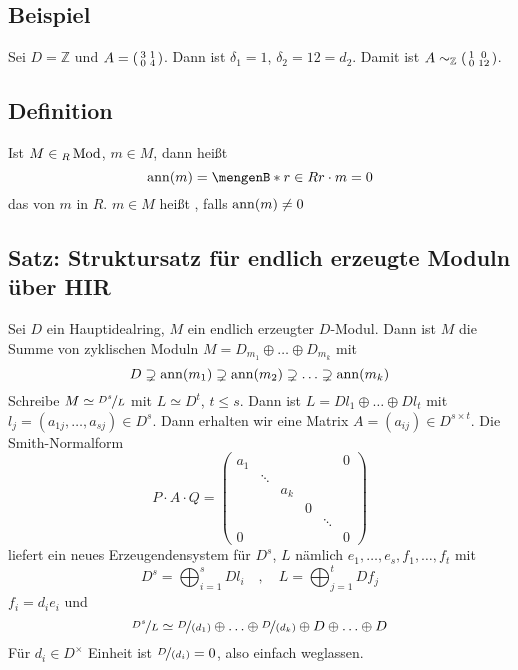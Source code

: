 \subsection[Beispiel: Elementarteilersatz]{Beispiel} %
\label{sub:246}
Sei $D= \mathds{Z}$ und $A = \begin{psmallmatrix}
	3 & 1 \\
	0 & 4
\end{psmallmatrix}$. Dann ist $\delta_1 = 1$, $\delta_2=12= d_2$. Damit ist $A \sim_\mathds{Z} \begin{psmallmatrix}
	1 & 0 \\
	0 & 12
\end{psmallmatrix}$.

\subsection[Definition: Annulatorideal und Torsionselement]{Definition} %
\label{sub:247}
Ist $M \in {_R\Mod}$, $m \in M$, dann heißt 
\[
	\ann(m) = \set[r \in R]{r \cdot m = 0} 
\]
das  von $m$ in $R$. $m \in M$ heißt , falls $\ann(m) \not= 0$  

\subsection{Satz: Struktursatz für endlich erzeugte Moduln über HIR} %
\label{sub:248}
Sei $D$ ein Hauptidealring, $M$ ein endlich erzeugter $D$-Modul. Dann ist $M$ die Summe von zyklischen Moduln $M= D_{m_1} \oplus \ldots \oplus D_{m_k}$ mit 
\[
	D \supsetneq \ann(m_1) \supsetneq \ann(m_2) \supsetneq \ldots \supsetneq \ann(m_k)
\]
Schreibe $M \simeq \nicefrac{D^s}{L}$ mit $L \simeq D^t$, $t \le s$. Dann ist $L= Dl_1 \oplus \ldots \oplus D l_t$ mit 
$l_j = (a_{1j}, \ldots , a_{sj}) \in D^s$. Dann erhalten wir eine Matrix $A= (a_{ij}) \in D^{s \times t}$. Die Smith-Normalform
\[
	P \cdot A \cdot Q = \begin{pmatrix}
		a_1 & & & & & 0 \\
		& \ddots & & & & \\
		& & a_k & & & \\
		& & & 0 & & \\
		& & && \ddots & \\
		0 & & & & & 0
	\end{pmatrix}
\]
liefert ein neues Erzeugendensystem für $D^s$, $L$ nämlich $e_1, \ldots , e_s, f_1, \ldots , f_t$ mit 
\[
	D^s = \bigoplus_{i=1}^s D{l_i} \quad , \quad L= \bigoplus_{j=1}^t D f_j
\]
$f_i = d_i e_i$ und 
\[
	\nicefrac{D^s}{L} \simeq \nicefrac{D}{(d_1)} \oplus \ldots \oplus \nicefrac{D}{(d_k)} \oplus D \oplus \ldots \oplus D
\]
Für $d_i \in D^\times$ Einheit ist $\nicefrac{D}{(d_i)} = 0$, also einfach weglassen.\bewende

